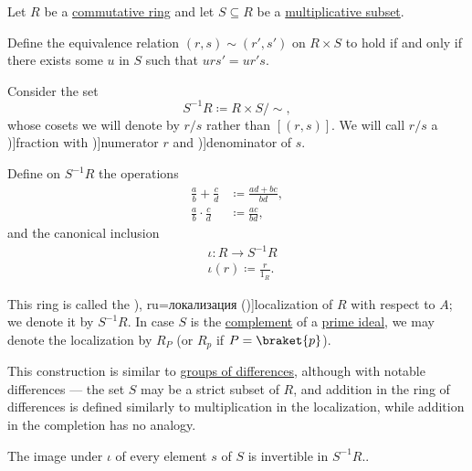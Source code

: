 \begin{definition}\label{def:ring_localization}
  Let \( R \) be a \hyperref[def:ring/commutative]{commutative ring} and let \( S \subseteq R \) be a \hyperref[def:multiplicatively_closed_ring_subset]{multiplicative subset}.

  Define the equivalence relation \( (r, s) \sim (r', s') \) on \( R \times S \) to hold if and only if there exists some \( u \) in \( S \) such that \( u r s' = u r' s \).

  Consider the set
  \begin{equation*}
    S^{-1} R \coloneqq R \times S / {\sim},
  \end{equation*}
  whose cosets we will denote by \( r / s \) rather than \( [(r, s)] \). We will call \( r / s \) a \term[en=fraction (\cite[39]{Bourbaki1998Algebra1to3})]{fraction} with \term[en=numerator (\cite[39]{Bourbaki1998Algebra1to3})]{numerator} \( r \) and \term[en=denominator (\cite[39]{Bourbaki1998Algebra1to3})]{denominator} of \( s \).

  Define on \( S^{-1} R \) the operations
  \begin{align*}
    \frac a b + \frac c d     &\coloneqq \frac {a d + b c} {b d}, \\
    \frac a b \cdot \frac c d &\coloneqq \frac {a c} {b d},
  \end{align*}
  and the canonical inclusion
  \begin{equation*}
    \begin{aligned}
      &\iota: R \to S^{-1} R \\
      &\iota(r) \coloneqq \frac r {1_R}.
    \end{aligned}
  \end{equation*}

  This ring is called the \term[bg=локализация (\cite[23]{КоцевСидеров2016КомутативнаАлгебра}), ru=локализация (\cite[348]{Тыртышников2017ОсновыАлгебры})]{localization} of \( R \) with respect to \( A \); we denote it by \( S^{-1} R \). In case \( S \) is the \hyperref[def:power_set_algebra]{complement} of a \hyperref[def:semiring_ideal/prime]{prime ideal}, we may denote the localization by \( R_P \) (or \( R_p \) if \( P = \braket{ p } \)).
\end{definition}
\begin{comments}
  \item This construction is similar to \hyperref[def:group_of_differences]{groups of differences}, although with notable differences --- the set \( S \) may be a strict subset of \( R \), and addition in the ring of differences is defined similarly to multiplication in the localization, while addition in the completion has no analogy.

  \item The image under \( \iota \) of every element \( s \) of \( S \) is invertible in \( S^{-1} R \)..
\end{comments}
